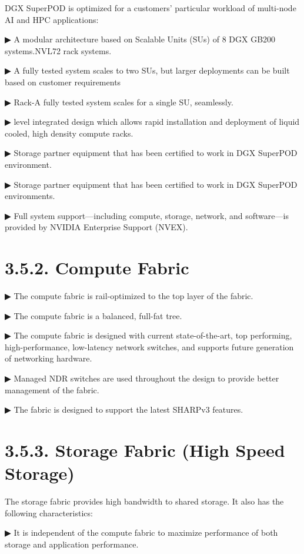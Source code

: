 \documentclass[
  10
]{article}
\begin{document}
DGX SuperPOD is optimized for a customers' particular workload of
multi-node AI and HPC applications:

▶ A modular architecture based on Scalable Units (SUs) of 8 DGX GB200
systems.NVL72 rack systems.

▶ A fully tested system scales to two SUs, but larger deployments can be
built based on customer requirements

▶ Rack-A fully tested system scales for a single SU, seamlessly.

▶ level integrated design which allows rapid installation and deployment
of liquid cooled, high density compute racks.

▶ Storage partner equipment that has been certified to work in DGX
SuperPOD environment.

▶ Storage partner equipment that has been certified to work in DGX
SuperPOD environments.

▶ Full system support---including compute, storage, network, and
software---is provided by NVIDIA Enterprise Support (NVEX).

\section{3.5.2. Compute Fabric}\label{compute-fabric}

▶ The compute fabric is rail-optimized to the top layer of the fabric.

▶ The compute fabric is a balanced, full-fat tree.

▶ The compute fabric is designed with current state-of-the-art, top
performing, high-performance, low-latency network switches, and supports
future generation of networking hardware.

▶ Managed NDR switches are used throughout the design to provide better
management of the fabric.

▶ The fabric is designed to support the latest SHARPv3 features.

\section{3.5.3. Storage Fabric (High Speed
Storage)}\label{storage-fabric-high-speed-storage}

The storage fabric provides high bandwidth to shared storage. It also
has the following characteristics:

▶ It is independent of the compute fabric to maximize performance of
both storage and application performance.
\end{document}
